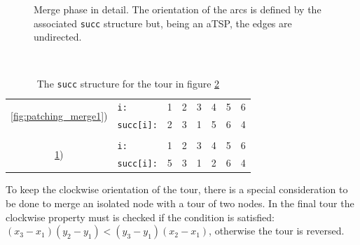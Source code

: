\begin{figure}[!h]
\begin{subfigure}{.26\columnwidth}
		\caption{}
		\label{fig:patching_merge3}
	\end{subfigure}

	\caption{Merge phase in detail. The orientation of the arcs is defined by the associated \texttt{succ} structure but, being an aTSP, the edges are undirected.}
	\label{fig:patching_merge}
\end{figure}\\

\begin{table}[h]
	\centering
	\caption{The \texttt{succ} structure for the tour in figure \ref{fig:patching_merge}}
	\begin{tabular}{clcccccc}
		\multirow{2}{*}{\ref{fig:patching_merge1})} 	& \texttt{i:}		& 1 & 2 & 3 & 4 & 5 & 6 \\
														& \texttt{succ[i]:}	& 2 & 3 & 1 & 5 & 6 & 4 \\
														&		   			&   &   &   &   &   &   \\
		\multirow{2}{*}{\ref{fig:patching_merge3})} 	& \texttt{i:}		& 1 & 2 & 3 & 4 & 5 & 6 \\
														& \texttt{succ[i]:}	& 5 & 3 & 1 & 2 & 6 & 4 \\
	\end{tabular}
\end{table}
To keep the clockwise orientation of the tour, there is a special consideration to be done to merge an isolated node with a tour of two nodes. In the final tour the clockwise property must is checked if the condition is satisfied:
$ (x_3 - x_1)(y_2 - y_1) < (y_3 - y_1)(x_2 - x_1) $,
otherwise the tour is reversed.
